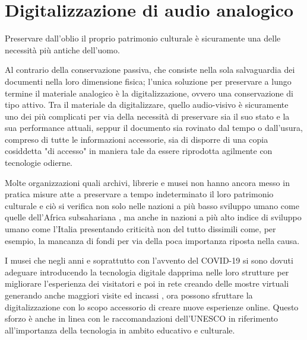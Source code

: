 
\chapter{Digitalizzazione di audio analogico} \label{chp:digitalizzazione}

Preservare dall'oblio il proprio patrimonio culturale è sicuramente una delle necessità più antiche dell'uomo.

Al contrario della conservazione passiva, che consiste nella sola salvaguardia dei documenti nella loro dimensione fisica; l'unica soluzione per preservare a lungo termine il materiale analogico è la digitalizzazione, ovvero una conservazione di tipo attivo.
Tra il materiale da digitalizzare, quello audio-visivo è sicuramente uno dei più complicati per via della necessità di preservare sia il suo stato e la sua performance attuali, seppur il documento sia rovinato dal tempo o dall'usura, compreso di tutte le informazioni accessorie, sia di disporre di una copia cosiddetta "di accesso" in maniera tale da essere riprodotta agilmente con tecnologie odierne.

Molte organizzazioni quali archivi, librerie e musei non hanno ancora messo in pratica misure atte a preservare a tempo indeterminato il loro patrimonio culturale e ciò si verifica non solo nelle nazioni a più basso sviluppo umano come quelle dell'Africa subsahariana \cite{rakemaneChallengesManagingPreserving2021}, ma anche in nazioni a più alto indice di sviluppo umano come l'Italia \cite{raimoDigitalizationCulturalIndustry2022} presentando criticità non del tutto dissimili come, per esempio, la mancanza di fondi per via della poca importanza riposta nella causa. %

I musei che negli anni e soprattutto con l'avvento del COVID-19 si sono dovuti adeguare introducendo la tecnologia digitale dapprima nelle loro strutture per migliorare l'esperienza dei visitatori e poi in rete creando delle mostre virtuali generando anche maggiori visite ed incassi \cite{raimoDigitalizationCulturalIndustry2022}, ora possono sfruttare la digitalizzazione con lo scopo accessorio di creare nuove esperienze online.
Questo sforzo è anche in linea con le raccomandazioni dell'UNESCO \cite{unescoRecommendationConcerningProtection} in riferimento all'importanza della tecnologia in ambito educativo e culturale.


